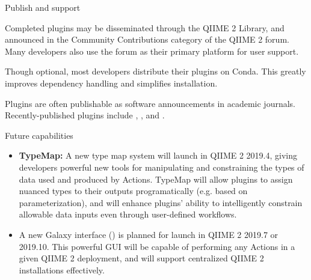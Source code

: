 \documentclass[final]{beamer}
\newlength{\colwidth}
\begin{document}
\begin{frame}[t]
\begin{columns}[t]
\begin{column}{\colwidth}
  \begin{block}{Publish and support}

    Completed plugins may be disseminated through the QIIME 2 Library, and announced
    in the Community Contributions category of the QIIME 2 forum. Many developers
    also use the forum as their primary platform for user support.

    Though optional, most developers distribute their plugins on Conda. This greatly
    improves dependency handling and simplifies installation.

    Plugins are often publishable as software announcements in academic journals.
    Recently-published plugins include \cite{Gibbons1006102},
    \cite{Rivers15704-1}, and \cite{Martinoe00016-19}.

  \end{block}

  \begin{block}{Future capabilities}

    \begin{itemize}
      \item \textbf{TypeMap:} A new type map system will launch in QIIME 2 2019.4,
      giving developers powerful new tools for manipulating and constraining the types of
      data used and produced by Actions. TypeMap will allow plugins to assign
      nuanced types to their outputs programatically (e.g. based on parameterization),
      and will enhance plugins' ability to intelligently constrain allowable data inputs
      even through user-defined workflows.
      \item \textbf{} A new Galaxy interface ()
      is planned for launch in QIIME 2 2019.7 or 2019.10. This powerful GUI will
      be capable of performing any Actions in a given QIIME 2 deployment, and
      will support centralized QIIME 2 installations effectively.
    \end{itemize}

  \end{block}


\end{column}
\end{columns}
\end{frame}
\end{document}
